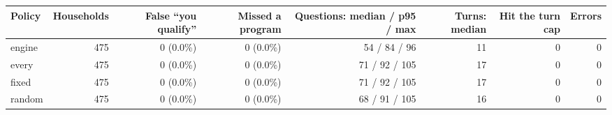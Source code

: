 \begin{tabular}{lrrrrrrr}
\toprule
Policy & Households & False ``you qualify'' & Missed a program & Questions: median / p95 / max & Turns: median & Hit the turn cap & Errors \\
\midrule
engine & 475 & 0 (0.0\%) & 0 (0.0\%) & 54 / 84 / 96 & 11 & 0 & 0 \\
every & 475 & 0 (0.0\%) & 0 (0.0\%) & 71 / 92 / 105 & 17 & 0 & 0 \\
fixed & 475 & 0 (0.0\%) & 0 (0.0\%) & 71 / 92 / 105 & 17 & 0 & 0 \\
random & 475 & 0 (0.0\%) & 0 (0.0\%) & 68 / 91 / 105 & 16 & 0 & 0 \\
\bottomrule
\end{tabular}
